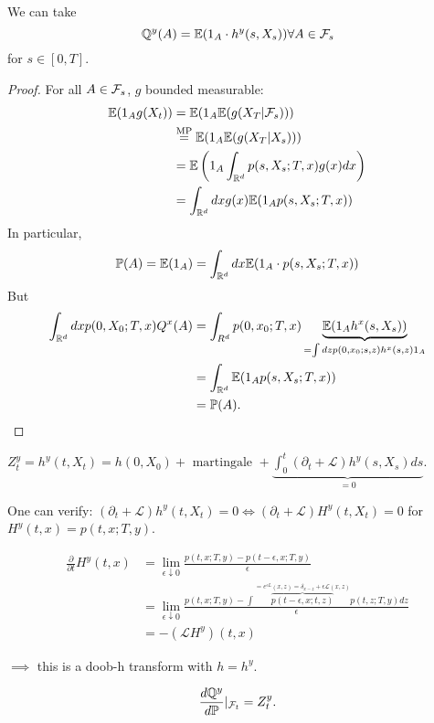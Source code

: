 \begin{lemma}\label{lem:2.5}
    We can take 
    \[\mathbb{Q}^y(A)=\mathbb{E}(1_{A}\cdot h^y(s,X_s))\forall A\in\mathcal{F}_s\]
    for $s\in [0,T]$.
\end{lemma}

\begin{proof}
    For all $A\in\mathcal{F}_s$, $g$ bounded measurable:
    \begin{align*}
        \mathbb{E}(1_Ag(X_t))&=\mathbb{E}(1_A\mathbb{E}(g(X_T|\mathcal{F}_s)))\\
        &\stackrel{\text{MP}}{=}\mathbb{E}(1_A\mathbb{E}(g(X_T|X_s)))\\
        &=\mathbb{E}\left(1_A\int_{\mathbb{R}^d}p(s,X_s;T,x)g(x)dx\right)\\
        &=\int_{\mathbb{R}^d}dx g(x)\mathbb{E}(1_Ap(s,X_s;T,x))
    \end{align*}
    In particular, 
    \begin{align*}
        \mathbb{P}(A)=\mathbb{E}(1_A)=\int_{\mathbb{R}^d}dx\mathbb{E}(1_A\cdot p(s,X_s;T,x))
    \end{align*}
    But 
    \begin{align*}
        \int_{\mathbb{R}^d}dx p(0,X_0;T,x)Q^x(A)&=\int_{R^d} p(0,x_0;T,x)\underbrace{\mathbb{E}(1_Ah^x(s,X_s))}_{=\int dzp(0,x_0;s,z)h^x(s,z)1_A}\\
        &=\int_{\mathbb{R}^d}\mathbb{E}(1_Ap(s,X_s;T,x))\\
        &=\mathbb{P}(A).\qedhere
    \end{align*}
\end{proof}

\begin{remark}
    $Z_t^y=h^y(t,X_t)=h(0,X_0)+\text{ martingale }+\underbrace{\int_0^t( \partial_t +\mathcal{L})h^y(s,X_s)ds}_{=0}.$

    One can verify: $(\partial_t+\mathcal{L})h^y(t,X_t)=0 \iff (\partial_t+\mathcal{L})H^y(t,X_t)=0$ for 
    $H^y(t,x)=p(t,x;T,y)$.

    \begin{align*}
        \frac{\partial}{\partial t}H^y(t,x)&=\lim_{\epsilon\downarrow0}\frac{p(t,x;T,y)-p(t-\epsilon,x;T,y)}{\epsilon}\\
        &=\lim_{\epsilon\downarrow 0} \frac{p(t,x;T,y)-\int \overbrace{p(t-\epsilon,x;t,z)}^{=e^{\epsilon L}(x,z)=\delta_{x-z}+\epsilon\mathcal{L}(x,z)}p(t,z;T,y)dz}{\epsilon}\\
        &=-(\mathcal{L}H^y)(t,x)
    \end{align*}

    $\implies$ this is a doob-h transform with $h=h^y$.

    \begin{align*}
        \frac{d\mathbb{Q}^y}{d\mathbb{P}}\vert_{\mathcal{F}_t}=Z_t^y.
    \end{align*}
\end{remark}


